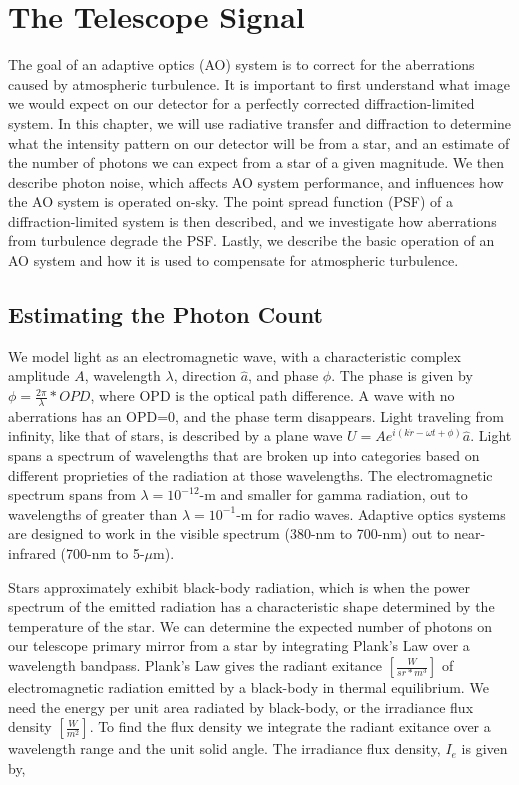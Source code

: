 \chapter{The Telescope Signal}\label{CH2}

 The goal of an adaptive optics (AO) system is to correct for the aberrations caused by atmospheric turbulence. It is important to first understand what image we would expect on our detector for a perfectly corrected diffraction-limited system. In this chapter, we will use radiative transfer and diffraction to determine what the intensity pattern on our detector will be from a star, and an estimate of the number of photons we can expect from a star of a given magnitude. We then describe photon noise, which affects AO system performance, and influences how the AO system is operated on-sky. The point spread function (PSF) of a diffraction-limited system is then described, and we investigate how aberrations from turbulence degrade the PSF. Lastly, we describe the basic operation of an AO system and how it is used to compensate for atmospheric turbulence.

\section{Estimating the Photon Count}\label{phcount}

We model light as an electromagnetic wave, with a characteristic complex amplitude $A$, wavelength $\lambda$, direction $\hat{a}$, and phase $\phi$. The phase is given by $\phi= \frac{2\pi}{\lambda}*OPD$, where OPD is the optical path difference. A wave with no aberrations has an OPD=0, and the phase term disappears. Light traveling from infinity, like that of stars, is described by a plane wave $U=Ae^{i(k\dot r-\omega t+ \phi)}\hat{a}$. Light spans a spectrum of wavelengths that are broken up into categories based on different proprieties of the radiation at those wavelengths. The electromagnetic spectrum spans from $\lambda=10^{-12}$-m and smaller for gamma radiation, out to wavelengths of greater than $\lambda=10^{-1}$-m for radio waves. Adaptive optics systems are designed to work in the visible spectrum (380-nm to 700-nm) out to near-infrared (700-nm to 5-$\mu$m).



Stars approximately exhibit black-body radiation, which is when the power spectrum of the emitted radiation has a characteristic shape determined by the temperature of the star. We can determine the expected number of photons on our telescope primary mirror from a star by integrating Plank's Law over a wavelength bandpass. Plank's Law gives the radiant exitance $[\frac{W}{sr*m^3}]$ of electromagnetic radiation emitted by a black-body in thermal equilibrium. We need the energy per unit area radiated by black-body, or the irradiance flux density $[\frac{W}{m^2}]$. To find the flux density we integrate the radiant exitance over a wavelength range and the unit solid angle. The irradiance flux density, $I_e$ is given by,

